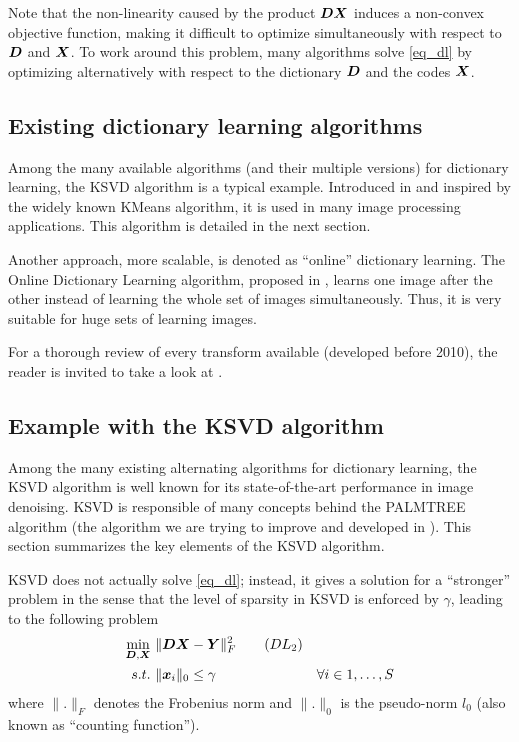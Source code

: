 Note that the non-linearity caused by the product $\bm{D}\bm{X}$ induces a non-convex objective function, making it difficult to optimize simultaneously with respect to $\bm{D}$ and $\bm{X}$. To work around this problem, many algorithms solve \eqref{eq_dl} by optimizing alternatively with respect to the dictionary $\bm{D}$ and the codes $\bm{X}$.

\subsection{Existing dictionary learning algorithms}
Among the many available algorithms (and their multiple versions) for dictionary learning, the \ac{KSVD} algorithm is a typical example. Introduced in \cite{aharon_k-svd:_2006} and inspired by the widely known \gls{KMeans} algorithm, it is used in many image processing applications. This algorithm is detailed in the next section.

\noindent
Another approach, more scalable, is denoted as “online” dictionary learning. The Online Dictionary Learning algorithm, proposed in \cite{mairal_online_2010}, learns one image after the other instead of learning the whole set of images simultaneously. Thus, it is very suitable for huge sets of learning images.

\noindent
For a thorough review of every transform available (developed before 2010), the reader is invited to take a look at  \cite{rubinstein_dictionaries_2010}.


\subsection{Example with the \acs{KSVD} algorithm}

Among the many existing alternating algorithms for dictionary learning, the \ac{KSVD} algorithm is well known for its state-of-the-art performance in image denoising. \ac{KSVD} is responsible of many concepts behind the \acs{PALMTREE} algorithm (the algorithm we are trying to improve and developed in \cite{chabiron_optimization_2016}). This section summarizes the key elements of the \ac{KSVD} algorithm.

\ac{KSVD} does not actually solve \eqref{eq_dl}; instead, it gives a solution for a “stronger” problem in the sense that the level of sparsity in \ac{KSVD} is enforced by $\gamma$, leading to the following problem
\begin{align*}
\underset{\bm{D},\bm{X}}{\min}~ & \lVert \bm{D}\bm{X}-\bm{Y} \rVert^2_F \tag{$DL_2$}\label{eq_dl_ksvd} \\
s.t.~& \lVert \bm{x}_i \rVert_0 \le \gamma & \forall i \in 1,\dots,S
\end{align*}
where $\lVert . \rVert_F$ denotes the Frobenius norm and $\lVert . \rVert_0$ is the pseudo-norm $l_0$ (also known as “counting function”).

